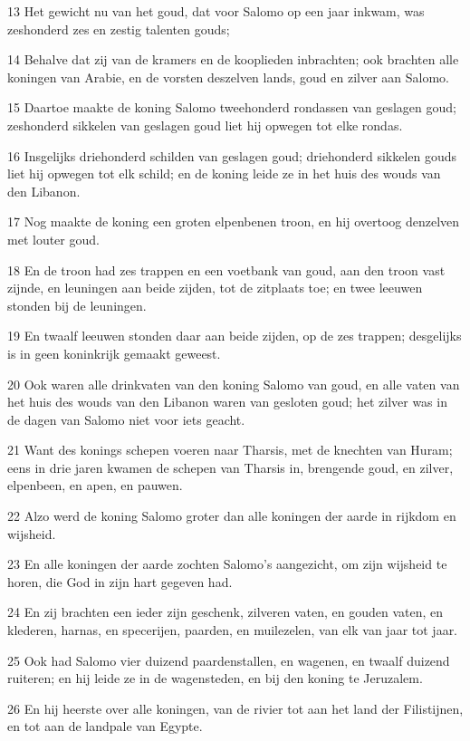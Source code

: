 \par 13 Het gewicht nu van het goud, dat voor Salomo op een jaar inkwam, was zeshonderd zes en zestig talenten gouds;
\par 14 Behalve dat zij van de kramers en de kooplieden inbrachten; ook brachten alle koningen van Arabie, en de vorsten deszelven lands, goud en zilver aan Salomo.
\par 15 Daartoe maakte de koning Salomo tweehonderd rondassen van geslagen goud; zeshonderd sikkelen van geslagen goud liet hij opwegen tot elke rondas.
\par 16 Insgelijks driehonderd schilden van geslagen goud; driehonderd sikkelen gouds liet hij opwegen tot elk schild; en de koning leide ze in het huis des wouds van den Libanon.
\par 17 Nog maakte de koning een groten elpenbenen troon, en hij overtoog denzelven met louter goud.
\par 18 En de troon had zes trappen en een voetbank van goud, aan den troon vast zijnde, en leuningen aan beide zijden, tot de zitplaats toe; en twee leeuwen stonden bij de leuningen.
\par 19 En twaalf leeuwen stonden daar aan beide zijden, op de zes trappen; desgelijks is in geen koninkrijk gemaakt geweest.
\par 20 Ook waren alle drinkvaten van den koning Salomo van goud, en alle vaten van het huis des wouds van den Libanon waren van gesloten goud; het zilver was in de dagen van Salomo niet voor iets geacht.
\par 21 Want des konings schepen voeren naar Tharsis, met de knechten van Huram; eens in drie jaren kwamen de schepen van Tharsis in, brengende goud, en zilver, elpenbeen, en apen, en pauwen.
\par 22 Alzo werd de koning Salomo groter dan alle koningen der aarde in rijkdom en wijsheid.
\par 23 En alle koningen der aarde zochten Salomo's aangezicht, om zijn wijsheid te horen, die God in zijn hart gegeven had.
\par 24 En zij brachten een ieder zijn geschenk, zilveren vaten, en gouden vaten, en klederen, harnas, en specerijen, paarden, en muilezelen, van elk van jaar tot jaar.
\par 25 Ook had Salomo vier duizend paardenstallen, en wagenen, en twaalf duizend ruiteren; en hij leide ze in de wagensteden, en bij den koning te Jeruzalem.
\par 26 En hij heerste over alle koningen, van de rivier tot aan het land der Filistijnen, en tot aan de landpale van Egypte.
